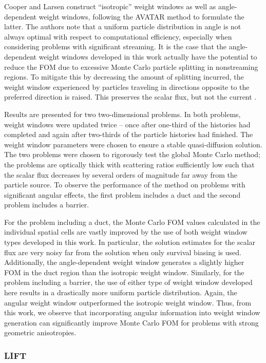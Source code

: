 Cooper and Larsen construct ``isotropic'' weight windows as well as angle-dependent
weight windows, following the AVATAR method to formulate the latter. The authors note
that a uniform particle distribution in angle is not always optimal with respect to
computational efficiency, especially when considering problems with significant
streaming. It is the case that the angle-dependent weight windows developed in this 
work actually have the potential to reduce the FOM due to excessive Monte Carlo 
particle splitting in nonstreaming regions. To mitigate this by decreasing the amount 
of splitting incurred, the weight window experienced by particles traveling in 
directions opposite to the preferred direction is raised. This preserves the scalar 
flux, but not the current \cite{clww}.

Results are presented for two two-dimensional problems. In both problems, weight
windows were updated twice -- once after one-third of the histories had completed and
again after two-thirds of the particle histories had finished. The weight window
parameters were chosen to ensure a stable quasi-diffusion solution. The two problems
were chosen to rigorously test the global Monte Carlo method; the problems are
optically thick with scattering ratios sufficiently low such that the scalar flux
decreases by several orders of magnitude far away from the particle source. To 
observe the performance of the method on problems with significant angular effects,
the first problem includes a duct and the second problem includes a barrier.

For the problem including a duct, the Monte Carlo FOM values calculated in the 
individual spatial cells are vastly improved by the use of both weight window types
developed in this work. In particular, the solution estimates for the scalar flux are
very noisy far from the solution when only survival biasing is used. Additionally, the
angle-dependent weight window generates a slightly higher FOM in the duct region than
the isotropic weight window. Similarly, for the problem including a barrier, the use
of either type of weight window developed here results in a drastically more uniform
particle distribution. Again, the angular weight window outperformed the isotropic
weight window. Thus, from this work, we observe that incorporating angular
information into weight window generation can significantly improve Monte Carlo FOM
for problems with strong geometric anisotropies.

\subsubsection{LIFT}

